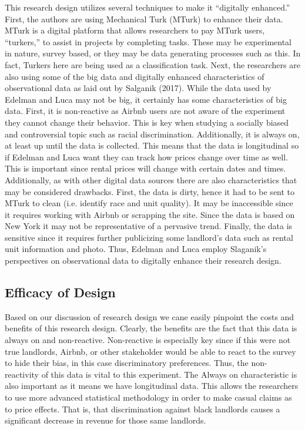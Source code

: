 \documentclass[dvips,12pt]{article}
\begin{document}
This research design utilizes several techniques to make it “digitally enhanced.” First, the authors are using Mechanical Turk (MTurk) to enhance their data. MTurk is a digital platform that allows researchers to pay MTurk users, “turkers,” to assist in projects by completing tasks. These may be experimental in nature, survey based, or they may be data generating processes such as this. In fact, Turkers here are being used as a classification task. Next, the researchers are also using some of the big data and digitally enhanced characteristics of observational data as laid out by Salganik (2017). While the data used by Edelman and Luca may not be big, it certainly has some characteristics of big data. First, it is non-reactive as Airbnb users are not aware of the experiment they cannot change their behavior. This is key when studying a socially biased and controversial topic such as racial discrimination. Additionally, it is always on, at least up until the data is collected. This means that the data is longitudinal so if Edelman and Luca want they can track how prices change over time as well. This is important since rental prices will change with certain dates and times. Additionally, as with other digital data sources there are also characteristics that may be considered drawbacks. First, the data is dirty, hence it had to be sent to MTurk to clean (i.e. identify race and unit quality). It may be inaccessible since it requires working with Airbnb or scrapping the site. Since the data is based on New York it may not be representative of a pervasive trend. Finally, the data is sensitive since it requires further publicizing some landlord’s data such as rental unit information and photo. Thus, Edelman and Luca employ Slaganik’s perspectives on observational data to digitally enhance their research design.

\subsection{Efficacy of Design}

Based on our discussion of research design we cane easily pinpoint the costs and benefits of this research design. Clearly, the benefits are the fact that this data is always on and non-reactive. Non-reactive is especially key since if this were not true landlords, Airbnb, or other stakeholder would be able to react to the survey to hide their bias, in this case discriminatory preferences. Thus, the non-reactivity of this data is vital to this experiment. The Always on characteristic is also important as it means we have longitudinal data. This allows the researchers to use more advanced statistical methodology in order to make casual claims as to price effects. That is, that discrimination against black landlords causes a significant decrease in revenue for those same landlords.
\end{document}
